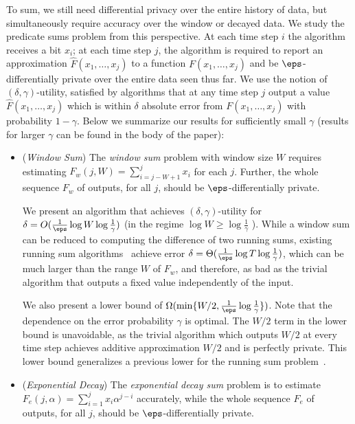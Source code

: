 {To sum, we still need differential privacy over the entire history of data, but simultaneously require accuracy over the window or decayed data.  
We study the predicate sums problem from this perspective.
}
At each time step $i$ the algorithm receives a bit $x_i$; at each time
step $j$, the algorithm is required to report an approximation
$\hat{F}(x_1, \ldots, x_{j})$ to a function $F(x_1, \ldots, x_{j})$
and be $\eps$-differentially private over the entire data seen thus far. We use the notion of $(\delta,
\gamma)$-utility, satisfied by algorithms that at any time step $j$
output a value $\hat{F}(x_1, \ldots, x_j)$ which is within $\delta$
absolute error from $F(x_1, \ldots, x_j)$ with probability
$1-\gamma$. Below we summarize our results for sufficiently small $\gamma$ (results for larger $\gamma$ can be found in the body of the paper):
\begin{itemize}
  \setlength{\itemsep}{0.5pt}
  \setlength{\parskip}{0pt}
  \setlength{\parsep}{0pt}
\item ({\em Window Sum})
  The \emph{window sum} problem with window
  size $W$ requires estimating $F_w(j, W) = \sum_{i = j - W +
    1}^j{x_i}$ for each $j$.  Further, the whole sequence $F_w$ of
  outputs, for all $j$, should be $\eps$-differentially private.
  
  \smallskip
We present an algorithm that achieves $(\delta, \gamma)$-utility for
$\delta = O(\frac{1}{\eps}\log W \log \frac{1}{\gamma})$ (in the regime
$\log W \geq \log \frac{1}{\gamma}$ ). 
While a window sum can be reduced to computing the
difference of two running sums, existing running sum
algorithms~\cite{dwork-continual,chan2010private} achieve error
$\delta = \Theta(\frac{1}{\eps}\log T\log \frac{1}{\gamma})$, which can be much
larger than the range $W$ of $F_w$, and therefore, as bad as the
trivial algorithm that outputs a fixed value independently of the input.

\smallskip
We also present a lower bound of $\Omega(\min\{W/2, \frac{1}{\eps}\log
\frac{1}{\gamma}\})$. Note that the dependence on the error probability
$\gamma$ is optimal. The $W/2$ term in the lower bound is unavoidable,
as the trivial algorithm which outputs $W/2$ at every time step
achieves additive approximation $W/2$ and is perfectly private. This
lower bound generalizes a previous lower for the running sum
problem~\cite{dwork-continual}. 

\smallskip
\item ({\em Exponential Decay}) The \emph{exponential decay sum}
  problem is to estimate $ F_e(j, \alpha) = \sum_{i = 1}^j{x_i
    \alpha^{j-i}}$ accurately, while the whole sequence $F_e$ of
  outputs, for all $j$, should be $\eps$-differentially private.


\end{itemize}
